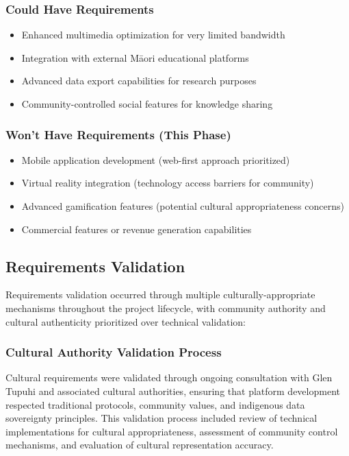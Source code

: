 \subsubsection{Could Have Requirements}
\label{subsubsec:could_have}

\begin{itemize}
    \item Enhanced multimedia optimization for very limited bandwidth
    \item Integration with external M\=aori educational platforms
    \item Advanced data export capabilities for research purposes
    \item Community-controlled social features for knowledge sharing
\end{itemize}

\subsubsection{Won't Have Requirements (This Phase)}
\label{subsubsec:wont_have}

\begin{itemize}
    \item Mobile application development (web-first approach prioritized)
    \item Virtual reality integration (technology access barriers for community)
    \item Advanced gamification features (potential cultural appropriateness concerns)
    \item Commercial features or revenue generation capabilities
\end{itemize}

\subsection{Requirements Validation}
\label{subsec:requirements_validation}

Requirements validation occurred through multiple culturally-appropriate mechanisms throughout the project lifecycle, with community authority and cultural authenticity prioritized over technical validation:

\subsubsection{Cultural Authority Validation Process}
\label{subsubsec:cultural_validation}

Cultural requirements were validated through ongoing consultation with Glen Tupuhi and associated cultural authorities, ensuring that platform development respected traditional protocols, community values, and indigenous data sovereignty principles. This validation process included review of technical implementations for cultural appropriateness, assessment of community control mechanisms, and evaluation of cultural representation accuracy.

